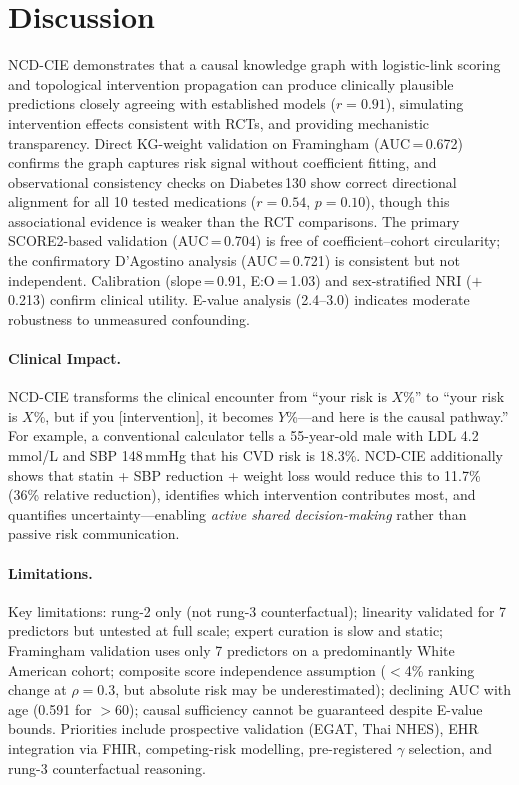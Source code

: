 \documentclass[runningheads]{llncs}
\begin{document}
\section{Discussion}\label{sec:discussion}

NCD-CIE demonstrates that a causal knowledge graph with logistic-link
scoring and topological intervention propagation can produce
clinically plausible predictions closely agreeing with established
models ($r = 0.91$), simulating intervention effects consistent with
RCTs, and providing mechanistic transparency.
Direct KG-weight validation on Framingham (AUC\,=\,0.672) confirms
the graph captures risk signal without coefficient fitting,
and observational consistency checks on Diabetes\,130 show
correct directional alignment for all 10 tested medications
($r = 0.54$, $p = 0.10$), though this associational evidence
is weaker than the RCT comparisons.
The primary SCORE2-based validation (AUC\,=\,0.704) is free of
coefficient--cohort circularity; the confirmatory D'Agostino analysis
(AUC\,=\,0.721) is consistent but not independent.
Calibration (slope\,=\,0.91, E:O\,=\,1.03) and sex-stratified
NRI ($+$0.213) confirm clinical utility.
E-value analysis (2.4--3.0) indicates moderate robustness to
unmeasured confounding.

\paragraph{Clinical Impact.}
NCD-CIE transforms the clinical encounter from ``your risk is
$X$\%'' to ``your risk is $X$\%, but if you [intervention], it
becomes $Y$\%---and here is the causal pathway.''
For example, a conventional calculator tells a 55-year-old male
with LDL 4.2\,mmol/L and SBP 148\,mmHg that his CVD risk is
18.3\%.
NCD-CIE additionally shows that statin + SBP reduction + weight
loss would reduce this to 11.7\% (36\% relative reduction),
identifies which intervention contributes most, and quantifies
uncertainty---enabling \emph{active shared decision-making} rather
than passive risk communication.

\paragraph{Limitations.}
Key limitations: rung-2 only (not rung-3 counterfactual); linearity
validated for 7 predictors but untested at full scale; expert curation
is slow and static; Framingham validation uses only 7 predictors on a
predominantly White American cohort; composite score independence
assumption ($<$4\% ranking change at $\rho=0.3$, but absolute risk
may be underestimated); declining AUC with age (0.591 for $>$60);
causal sufficiency cannot be guaranteed despite E-value bounds.
Priorities include prospective validation (EGAT, Thai NHES),
EHR integration via FHIR, competing-risk modelling,
pre-registered $\gamma$ selection, and rung-3 counterfactual
reasoning.
\end{document}
